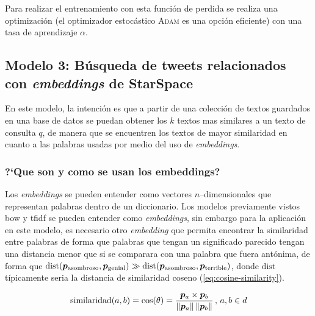 Para realizar el entrenamiento con esta función de perdida se realiza una optimización (el optimizador estocástico \textsc{Adam} \cite{Kingma2014} es una opción eficiente) con una tasa de aprendizaje $\alpha$.


\subsection{Modelo 3: Búsqueda de tweets relacionados con \emph{embeddings} de \mbox{StarSpace}}
En este modelo, la intención es que a partir de una colección de textos guardados en una base de datos se puedan obtener los $k$ textos mas similares a un texto de consulta $q$, de manera que se encuentren los textos de mayor similaridad en cuanto a las palabras usadas por medio del uso de \emph{embeddings}.


\subsubsection{?`Que son y como se usan los embeddings?}
Los \emph{embeddings} se pueden entender como vectores $n$--dimensionales que representan palabras dentro de un diccionario. Los modelos previamente vistos \gls{bow} y \gls{tfidf} se pueden entender como \emph{embeddings}, sin embargo para la aplicación en este modelo, es necesario otro \emph{embedding} que permita encontrar la similaridad entre palabras de forma que palabras que tengan un significado parecido tengan una distancia menor que si se comparara con una palabra que fuera antónima, de forma que $\mathrm{dist}({\bm{p}}_{\mathrm{asombroso}}, {\bm{p}}_{\mathrm{genial}}) \gg \mathrm{dist}({\bm{p}}_{\mathrm{asombroso}}, {\bm{p}}_{\mathrm{terrible}})$, donde $\mathrm{dist}$ típicamente seria la distancia de similaridad coseno (\cref{eq:cosine-similarity}).

\begin{equation} \label{eq:cosine-similarity}
  \mathrm{similaridad}(a, b) = \cos(\theta) = \frac{{\bm{p}}_a \times {\bm{p}}_b}{\left\lVert{\bm{p}}_a\right\rVert \left\lVert{\bm{p}}_b\right\rVert} \,,\, a, b \in d
\end{equation}

